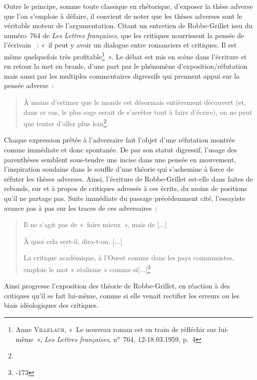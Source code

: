 \documentclass[12pt, a4paper]{article}
\begin{document}
Outre le principe, somme toute classique en rhétorique, d'exposer la thèse adverse que l'on s'emploie à défaire, il convient de noter que les thèses adverses sont le véritable moteur de l'argumentation. Citant un entretien de Robbe-Grillet issu du numéro~764 de \textit{Les Lettres françaises}, \galia{} que les critiques nourrissent la pensée de l'écrivain \robbe~: «~il peut y avoir un dialogue entre romanciers et critiques. Il est même quelquefois très profitable\footnote{Anne \textsc{Villelaur}, «~Le nouveau roman est en train de réfléchir sur lui-même~», \textit{Les Lettres françaises}, n°~764, 12-18.03.1959, p.~4}~». Le débat est mis en scène dans l'écriture et en retour la met en branle, d'une part par le phénomène d'exposition/réfutation mais aussi par les multiples commentaires digressifs qui prennent appui sur la pensée adverse~: 
\begin{quote}
À moins d’estimer que le monde est désormais entièrement découvert (et, dans ce cas, le plus sage serait de s’arrêter tout à faire d’écrire), on ne peut que tenter d’aller plus loin\footnote{}.    
\end{quote}
Chaque expression prêtée à l'adversaire fait l'objet d'une réfutation montrée comme immédiate et donc spontanée. De par son statut digressif, l'usage des parenthèses semblent sous-tendre une incise dans une pensée en mouvement, l'inspiration soudaine dans le souffle d'une théorie qui s'achemine à force de réfuter les thèses adverses. Ainsi, l'écriture de Robbe-Grillet est-elle dans \punr{} faites de rebonds, sur et à propos de critiques adressés à ces écrits, du moins de positions qu'il ne partage pas. Suite immédiate du passage précédemment cité, l'essayiste avance pas à pas sur les traces de ces adversaires~:
\begin{quote}
    Il ne s’agit pas de «~faire mieux~», mais de [...]
    
    À quoi cela sert-il, dira-t-on, [...]
    
    La critique académique, à l’Ouest comme dans les pays communistes, emploie le mot « réalisme » comme si[...]\footnote{-173}
\end{quote}

Ainsi progresse l'exposition des théorie de Robbe-Grillet, en réaction à des critiques qu'il se fait lui-même, comme si elle venait rectifier les erreurs ou les biais idéologiques des critiques.

\end{document}

